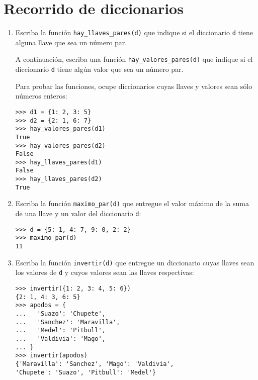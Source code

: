 \section{Recorrido de diccionarios}

\begin{enumerate}


\item
Escriba la función
\lstinline!hay_llaves_pares(d)! que indique si el diccionario
\lstinline!d! tiene alguna llave que sea un número par.

A continuación, escriba una función \lstinline!hay_valores_pares(d)! que
indique si el diccionario \lstinline!d! tiene algún valor que sea un
número par.

Para probar las funciones, ocupe diccionarios cuyas llaves y valores
sean sólo números enteros:

\begin{lstlisting}
>>> d1 = {1: 2, 3: 5}
>>> d2 = {2: 1, 6: 7}
>>> hay_valores_pares(d1)
True
>>> hay_valores_pares(d2)
False
>>> hay_llaves_pares(d1)
False
>>> hay_llaves_pares(d2)
True
\end{lstlisting}

\item
Escriba la función \lstinline!maximo_par(d)! que
entregue el valor máximo de la suma de una llave y un valor del
diccionario \lstinline!d!:

\begin{lstlisting}
>>> d = {5: 1, 4: 7, 9: 0, 2: 2}
>>> maximo_par(d)
11
\end{lstlisting}

\item
Escriba la función \lstinline!invertir(d)! que
entregue un diccionario cuyas llaves sean los valores de \lstinline!d! y
cuyos valores sean las llaves respectivas:

\begin{lstlisting}
>>> invertir({1: 2, 3: 4, 5: 6})
{2: 1, 4: 3, 6: 5}
>>> apodos = {
...   'Suazo': 'Chupete',
...   'Sanchez': 'Maravilla',
...   'Medel': 'Pitbull',
...   'Valdivia': 'Mago',
... }
>>> invertir(apodos)
{'Maravilla': 'Sanchez', 'Mago': 'Valdivia',
'Chupete': 'Suazo', 'Pitbull': 'Medel'}
\end{lstlisting}

\end{enumerate}
